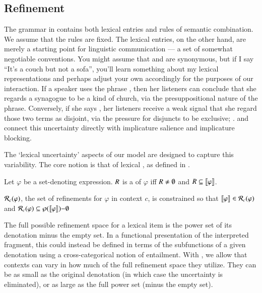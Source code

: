 \documentclass[leqno,12pt]{article}
\begin{document}

\subsection{Refinement}\label{sec:refine}


The grammar in  contains both lexical entries and
rules of semantic combination. We assume that the rules are fixed.
The lexical entries, on the other hand, are merely a starting point
for linguistic communication --- a set of somewhat negotiable
conventions. You might assume that  and  are
synonymous, but if I say ``It's a couch but not a sofa'', you'll learn
something about my lexical representations and perhaps adjust your own
accordingly for the purposes of our interaction.  If a speaker uses
the phrase , then her listeners
can conclude that she regards a synagogue to be a kind of church, via
the presuppositional nature of the phrase. Conversely, if she says
, her listeners receive a weak signal that
she regard those two terms as disjoint, via the pressure for disjuncts
to be exclusive; \citep{Hurford:1974}. \citet{Chemla-HurfordCounts} and
\citet{Potts:Levy:2015} connect this uncertainty directly with
implicature salience and implicature blocking.

The `lexical uncertainty' aspects of our model are designed to capture
this variability. The core notion is that of lexical
, as defined in .
%
\begin{examples}
\item\label{refinement} 
  \begin{examples}
  \item Let $\varphi$ be a set-denoting expression. $R$ is a
     of $\varphi$ iff $R \neq \emptyset$ and
    $R \subseteq \llbracket\varphi\rrbracket$.
  \item\label{refine} $\mathcal{R}_{c}(\varphi)$, the set of refinements for
    $\varphi$ in context $c$, is constrained so that
    $\llbracket\varphi\rrbracket \in \mathcal{R}_{c}(\varphi)$ and
    $\mathcal{R}_{c}(\varphi) \subseteq \wp(\llbracket\varphi\rrbracket){-}\emptyset$
  \end{examples}
\end{examples}
%
The full possible refinement space for a lexical item is the power set
of its denotation minus the empty set. In a functional presentation of
the interpreted fragment, this could instead be defined in terms of
the subfunctions of a given denotation using a cross-categorical
notion of entailment. With , we allow that
contexts can vary in how much of the full refinement space they
utilize. They can be as small as the original denotation (in which
case the uncertainty is eliminated), or as large as the full power set
(minus the empty set).
\end{document}
